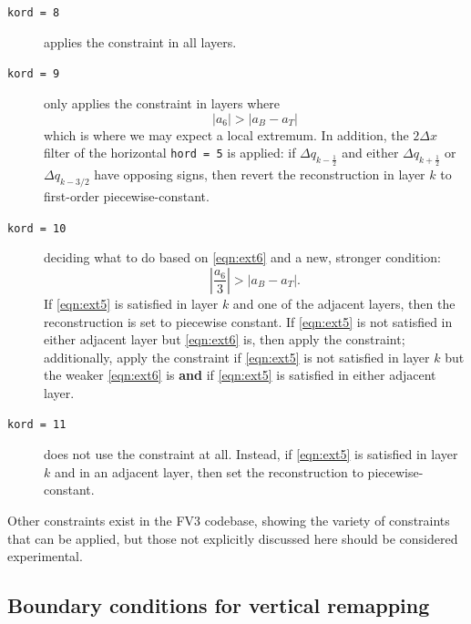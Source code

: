 \documentclass[10pt,letterpaper,margin=1in]{memoir}
\newcommand{\half}{\frac{1}{2}}
\begin{document}
\begin{description}
\item[\texttt{kord = 8}] applies the \citet{Huynh1997} constraint in all  layers.
\item[\texttt{kord = 9}] only applies the \citet{Huynh1997} constraint in layers where 
\begin{equation}
\left | a_6 \right | > \left | a_B - a_T \right | \label{eqn:ext6}
\end{equation}
which is where we may expect a local extremum. In addition, the $2\Delta x$ filter of the horizontal \texttt{hord = 5} is applied: if $\Delta q_{k-\half}$ and either $\Delta q_{k+\half}$ or $\Delta q_{k-3/2}$ have opposing signs, then revert the reconstruction in layer $k$ to first-order piecewise-constant.
\item[\texttt{kord = 10}] deciding what to do based on \eqref{eqn:ext6} and a new, stronger condition:
\begin{equation}
\left | \frac{a_6}{3} \right | > \left | a_B - a_T \right | \label{eqn:ext5}.
\end{equation}
If \eqref{eqn:ext5} is satisfied in  layer $k$ and one of the adjacent  layers, then the reconstruction is set to piecewise constant. If \eqref{eqn:ext5} is not satisfied in either adjacent layer but \eqref{eqn:ext6} is, then apply the \citet{Huynh1997} constraint; additionally, apply the \citet{Huynh1997} constraint if \eqref{eqn:ext5} is not satisfied in layer $k$ but the weaker \eqref{eqn:ext6} is \textbf{and} if \eqref{eqn:ext5} is satisfied in either adjacent layer.
\item[\texttt{kord = 11}] does not use the  \citet{Huynh1997} constraint at all. Instead, if \eqref{eqn:ext5} is satisfied in layer $k$ and in an adjacent layer, then set the reconstruction to piecewise-constant.
\end{description}
Other constraints exist in the FV3 codebase, showing the variety of constraints that can be applied, but those not explicitly discussed here should be considered experimental.


\subsection{Boundary conditions for vertical remapping}
\end{document}
